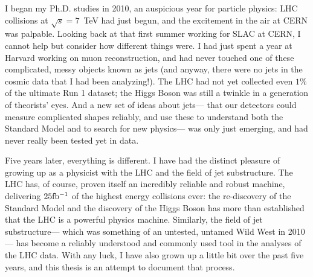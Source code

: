 
I began my Ph.D. studies in 2010, an auspicious year for particle physics: LHC collisions at $\sqrt{s} = 7$~TeV had just begun, and the excitement in the air at CERN was palpable. Looking back at that first summer working for SLAC at CERN, I cannot help but consider how different things were. I had just spent a year at Harvard working on muon reconstruction, and had never touched one of these complicated, messy objects known as jets (and anyway, there were no jets in the cosmic data that I had been analyzing!). The LHC had not yet collected even $1\%$ of the ultimate Run 1 dataset; the Higgs Boson was still a twinkle in a generation of theorists' eyes. And a new set of ideas about jets--- that our detectors could measure complicated shapes reliably, and use these to understand both the Standard Model and to search for new physics--- was only just emerging, and had never really been tested yet in data. 

Five years later, everything is different. I have had the distinct pleasure of growing up as a physicist with the LHC and the field of jet substructure. The LHC has, of course, proven itself an incredibly reliable and robust machine, delivering $25 \mbox{fb$^{-1}$}$ of the highest energy collisions ever: the re-discovery of the Standard Model and the discovery of the Higgs Boson has more than established that the LHC is a powerful physics machine. Similarly, the field of jet substructure--- which was something of an untested, untamed Wild West in 2010--- has become a reliably understood  and commonly used tool in the analyses of the LHC data. With any luck, I have also grown up a little bit over the past five years, and this thesis is an attempt to document that process.